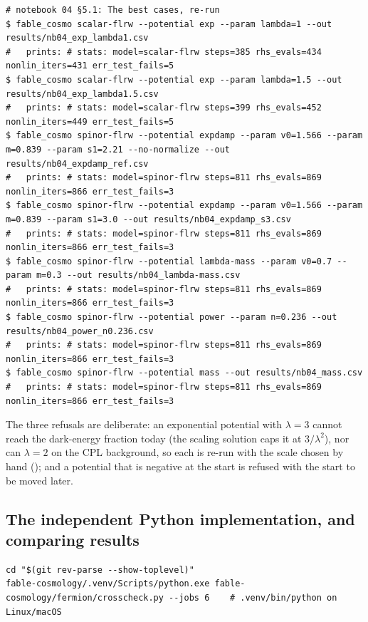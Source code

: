 \begin{Verbatim}
# notebook 04 §5.1: The best cases, re-run
$ fable_cosmo scalar-flrw --potential exp --param lambda=1 --out results/nb04_exp_lambda1.csv
#   prints: # stats: model=scalar-flrw steps=385 rhs_evals=434 nonlin_iters=431 err_test_fails=5
$ fable_cosmo scalar-flrw --potential exp --param lambda=1.5 --out results/nb04_exp_lambda1.5.csv
#   prints: # stats: model=scalar-flrw steps=399 rhs_evals=452 nonlin_iters=449 err_test_fails=5
$ fable_cosmo spinor-flrw --potential expdamp --param v0=1.566 --param m=0.839 --param s1=2.21 --no-normalize --out results/nb04_expdamp_ref.csv
#   prints: # stats: model=spinor-flrw steps=811 rhs_evals=869 nonlin_iters=866 err_test_fails=3
$ fable_cosmo spinor-flrw --potential expdamp --param v0=1.566 --param m=0.839 --param s1=3.0 --out results/nb04_expdamp_s3.csv
#   prints: # stats: model=spinor-flrw steps=811 rhs_evals=869 nonlin_iters=866 err_test_fails=3
$ fable_cosmo spinor-flrw --potential lambda-mass --param v0=0.7 --param m=0.3 --out results/nb04_lambda-mass.csv
#   prints: # stats: model=spinor-flrw steps=811 rhs_evals=869 nonlin_iters=866 err_test_fails=3
$ fable_cosmo spinor-flrw --potential power --param n=0.236 --out results/nb04_power_n0.236.csv
#   prints: # stats: model=spinor-flrw steps=811 rhs_evals=869 nonlin_iters=866 err_test_fails=3
$ fable_cosmo spinor-flrw --potential mass --out results/nb04_mass.csv
#   prints: # stats: model=spinor-flrw steps=811 rhs_evals=869 nonlin_iters=866 err_test_fails=3
\end{Verbatim}

The three refusals are deliberate: an exponential potential with $\lambda = 3$ cannot reach the dark-energy fraction today (the scaling solution caps it at $3/\lambda^{2}$), nor can $\lambda = 2$ on the CPL background, so each is re-run with the scale chosen by hand (); and a potential that is negative at the start is refused with the start to be moved later.

\subsection{The independent Python implementation, and comparing results}
\label{sec:6.5}

\begin{Verbatim}
cd "$(git rev-parse --show-toplevel)"
fable-cosmology/.venv/Scripts/python.exe fable-cosmology/fermion/crosscheck.py --jobs 6    # .venv/bin/python on Linux/macOS
\end{Verbatim}

